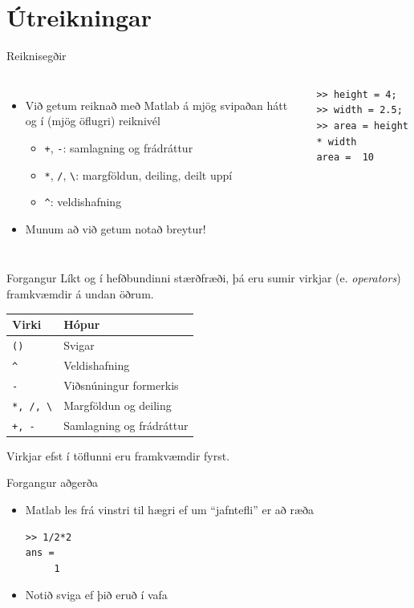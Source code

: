 \documentclass[handout]{beamer}
\begin{document}
\section{Útreikningar}

\begin{frame}[fragile]{Reiknisegðir}
\begin{columns}
\begin{itemize}
 \item Við getum reiknað með Matlab á mjög svipaðan hátt og í (mjög öflugri) reiknivél
 \begin{itemize}
  \item \texttt{+}, \texttt{-}: samlagning og frádráttur
  \item \texttt{*}, \texttt{/}, \texttt{\textbackslash}: margföldun, deiling, deilt uppí
  \item \texttt{\^}: veldishafning
 \end{itemize}
 \item Munum að við getum notað breytur!
\end{itemize}
\begin{verbatim}
>> height = 4;
>> width = 2.5;
>> area = height * width
area =  10
\end{verbatim}
\end{columns}
\end{frame}

\begin{frame}{Forgangur}
Líkt og í hefðbundinni stærðfræði, þá eru sumir virkjar (e. \emph{operators}) framkvæmdir á undan öðrum.
\begin{center}
\begin{tabular}{ll}
\toprule
Virki&Hópur\\
\midrule
\texttt{()}&Svigar\\
\texttt{\^}&Veldishafning\\
\texttt{-}&Viðsnúningur formerkis\\
\texttt{*, /, \textbackslash}&Margföldun og deiling\\
\texttt{+, -}&Samlagning og frádráttur\\
\bottomrule
\end{tabular}
\end{center}
Virkjar efst í töflunni eru framkvæmdir fyrst.
\end{frame}

\begin{frame}[fragile]{Forgangur aðgerða}
\begin{itemize}
 \item Matlab les frá vinstri til hægri ef um ``jafntefli'' er að ræða
\begin{verbatim}
>> 1/2*2
ans =
     1
\end{verbatim}
 \item Notið sviga ef þið eruð í vafa
\end{itemize}
\end{frame}
\end{document}
